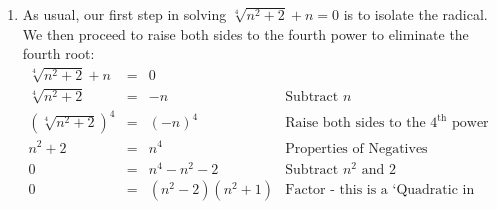 \documentclass{ximera}
\begin{document}
\begin{example}
\begin{explanation}
\begin{enumerate}
\[\begin{array}{rclr}
4x - 1 & = & 5 - 8x - 4\sqrt{1-2x} &  \\  

12x - 6 & = & -4\sqrt{1-2x} & \text{Subtract $5$, add $8x$}\\  

(12x-6)^2 & = & (-4\sqrt{1-2x})^2 & \text{Square both sides} \\ 

144x^2 - 144x + 36 & = & 16(1-2x) & \\  

144x^2 -  144x + 36 & = & 16 - 32x & \\ 

144x^2 - 112x + 20 & = & 0 & \text{Subtract $16$, add $32x$} \\ 

4(36x^2 - 28x + 5) & = & 0 & \text{Factor} \\ 

4(2x-1)(18x - 5) & = & 0 & \text{Factor some more} \\

\end{array} \] From the Zero Product Property, we know either $2x-1 = 0$ or $18x - 5 = 0$.  The former gives $x = \frac{1}{2}$ while the latter gives us $x = \frac{5}{18}$.  Since we squared both sides of the equation (twice!), we need to check for extraneous solutions.  We find $x = \frac{5}{18}$ to be extraneous, so our only solution is $x = \frac{1}{2}$.

\item As usual, our first step in solving $\sqrt[4]{n^2 + 2} + n = 0$ is to isolate the radical.  We then proceed to raise both sides to the fourth power to eliminate the fourth root:\[ \begin{array}{rclr}

\sqrt[4]{n^2 + 2} + n & = & 0 &  \\

\sqrt[4]{n^2 + 2} & = &  -n & \text{Subtract $n$} \\

(\sqrt[4]{n^2 + 2})^4 & = & (-n)^4 & \text{Raise both sides to the $4^{\text{th}}$ power} \\

n^2 + 2 & = & n^4 & \text{Properties of Negatives}\\

0 & = & n^{4} - n^2 - 2 & \text{Subtract $n^2$ and $2$} \\

0 & = & (n^2 - 2)(n^2 + 1) & \text{Factor - this is a `Quadratic in Disguise'} \\


\end{array}\]
\end{enumerate}
\end{explanation}
\end{example}
\end{document}
